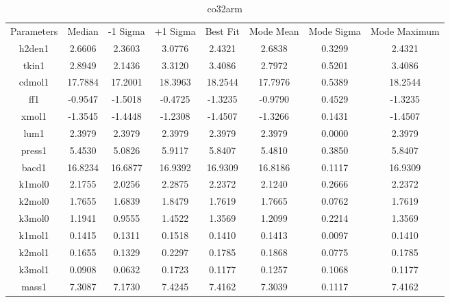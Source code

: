 \begin{table}
\caption{co32arm}
\begin{tabular}{cccccccc}
Parameters & Median & -1 Sigma & +1 Sigma & Best Fit & Mode Mean & Mode Sigma & Mode Maximum \\
h2den1 & 2.6606 & 2.3603 & 3.0776 & 2.4321 & 2.6838 & 0.3299 & 2.4321 \\
tkin1 & 2.8949 & 2.1436 & 3.3120 & 3.4086 & 2.7972 & 0.5201 & 3.4086 \\
cdmol1 & 17.7884 & 17.2001 & 18.3963 & 18.2544 & 17.7976 & 0.5389 & 18.2544 \\
ff1 & -0.9547 & -1.5018 & -0.4725 & -1.3235 & -0.9790 & 0.4529 & -1.3235 \\
xmol1 & -1.3545 & -1.4448 & -1.2308 & -1.4507 & -1.3266 & 0.1431 & -1.4507 \\
lum1 & 2.3979 & 2.3979 & 2.3979 & 2.3979 & 2.3979 & 0.0000 & 2.3979 \\
press1 & 5.4530 & 5.0826 & 5.9117 & 5.8407 & 5.4810 & 0.3850 & 5.8407 \\
bacd1 & 16.8234 & 16.6877 & 16.9392 & 16.9309 & 16.8186 & 0.1117 & 16.9309 \\
k1mol0 & 2.1755 & 2.0256 & 2.2875 & 2.2372 & 2.1240 & 0.2666 & 2.2372 \\
k2mol0 & 1.7655 & 1.6839 & 1.8479 & 1.7619 & 1.7665 & 0.0762 & 1.7619 \\
k3mol0 & 1.1941 & 0.9555 & 1.4522 & 1.3569 & 1.2099 & 0.2214 & 1.3569 \\
k1mol1 & 0.1415 & 0.1311 & 0.1518 & 0.1410 & 0.1413 & 0.0097 & 0.1410 \\
k2mol1 & 0.1655 & 0.1329 & 0.2297 & 0.1785 & 0.1868 & 0.0775 & 0.1785 \\
k3mol1 & 0.0908 & 0.0632 & 0.1723 & 0.1177 & 0.1257 & 0.1068 & 0.1177 \\
mass1 & 7.3087 & 7.1730 & 7.4245 & 7.4162 & 7.3039 & 0.1117 & 7.4162 \\
\end{tabular}
\end{table}
